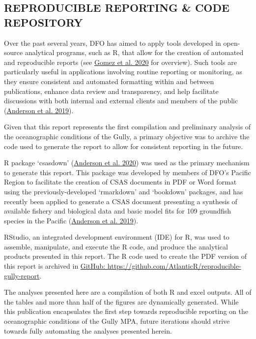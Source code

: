 \documentclass[12pt]{article}\usepackage[]{graphicx}\usepackage[]{color}
\begin{document}
\hypertarget{reproducible-reporting-code-repository}{%
\subsection{\texorpdfstring{\textbf{REPRODUCIBLE REPORTING \& CODE REPOSITORY}}{REPRODUCIBLE REPORTING \& CODE REPOSITORY}}\label{reproducible-reporting-code-repository}}

Over the past several years, DFO has aimed to apply tools developed in open-source analytical programs, such as R, that allow for the creation of automated and reproducible reports (see \protect\hyperlink{ref-gomez_2020}{Gomez et al. 2020} for overview). Such tools are particularly useful in applications involving routine reporting or monitoring, as they ensure consistent and automated formatting within and between publications, enhance data review and transparency, and help facilitate discussions with both internal and external clients and members of the public (\protect\hyperlink{ref-anderson_2019}{Anderson et al. 2019}).

Given that this report represents the first compilation and preliminary analysis of the oceanographic conditions of the Gully, a primary objective was to archive the code used to generate the report to allow for consistent reporting in the future.

R package `csasdown' (\protect\hyperlink{ref-anderson_2020}{Anderson et al. 2020}) was used as the primary mechanism to generate this report. This package was developed by members of DFO's Pacific Region to facilitate the creation of CSAS documents in PDF or Word format using the previously-developed `rmarkdown' and `bookdown' packages, and has recently been applied to generate a CSAS document presenting a synthesis of available fishery and biological data and basic model fits for 109 groundfish species in the Pacific (\protect\hyperlink{ref-anderson_2019}{Anderson et al. 2019}).

RStudio, an integrated development environment (IDE) for R, was used to assemble, manipulate, and execute the R code, and produce the analytical products presented in this report. The R code used to create the PDF version of this report is archived in \href{https://github.com/AtlanticR/reproducible-gully-report}{GitHub: https://github.com/AtlanticR/reproducible-gully-report}.

The analyses presented here are a compilation of both R and excel outputs. All of the tables and more than half of the figures are dynamically generated. While this publication encapsulates the first step towards reproducible reporting on the oceanographic conditions of the Gully MPA, future iterations should strive towards fully automating the analyses presented herein.
\end{document}
